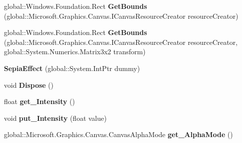 \begin{DoxyCompactItemize}
\mbox{\label{class_microsoft_1_1_graphics_1_1_canvas_1_1_effects_1_1_sepia_effect_add8f6369add3dc63f033fece446695bb}} 
global\+::\+Windows.\+Foundation.\+Rect {\bfseries Get\+Bounds} (global\+::\+Microsoft.\+Graphics.\+Canvas.\+I\+Canvas\+Resource\+Creator resource\+Creator)
\item 
\mbox{\label{class_microsoft_1_1_graphics_1_1_canvas_1_1_effects_1_1_sepia_effect_a383c90027b969cb3a3d212a103518d83}} 
global\+::\+Windows.\+Foundation.\+Rect {\bfseries Get\+Bounds} (global\+::\+Microsoft.\+Graphics.\+Canvas.\+I\+Canvas\+Resource\+Creator resource\+Creator, global\+::\+System.\+Numerics.\+Matrix3x2 transform)
\item 
\mbox{\label{class_microsoft_1_1_graphics_1_1_canvas_1_1_effects_1_1_sepia_effect_a4f03d37d7ecbcbf4f61d46c7966819d0}} 
{\bfseries Sepia\+Effect} (global\+::\+System.\+Int\+Ptr dummy)
\item 
\mbox{\label{class_microsoft_1_1_graphics_1_1_canvas_1_1_effects_1_1_sepia_effect_a3195a9cdd413f190255cdcda3170755b}} 
void {\bfseries Dispose} ()
\item 
\mbox{\label{class_microsoft_1_1_graphics_1_1_canvas_1_1_effects_1_1_sepia_effect_aa2ff226eed0accddfe57da8d29180372}} 
float {\bfseries get\+\_\+\+Intensity} ()
\item 
\mbox{\label{class_microsoft_1_1_graphics_1_1_canvas_1_1_effects_1_1_sepia_effect_a31889c7859564211fe6944237497aa2d}} 
void {\bfseries put\+\_\+\+Intensity} (float value)
\item 
\mbox{\label{class_microsoft_1_1_graphics_1_1_canvas_1_1_effects_1_1_sepia_effect_ac68e49d7dca255583a419f008aae3de1}} 
global\+::\+Microsoft.\+Graphics.\+Canvas.\+Canvas\+Alpha\+Mode {\bfseries get\+\_\+\+Alpha\+Mode} ()
\item 

\end{DoxyCompactItemize}
